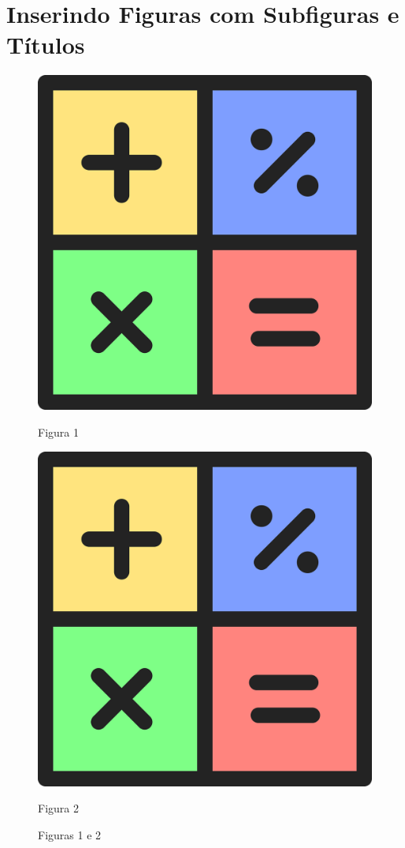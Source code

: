 \documentclass[12pt,a4paper]{article}
\begin{document}
\section{Inserindo Figuras com Subfiguras e Títulos}

\begin{figure}[H]
  \centering
  \begin{minipage}{0.45\textwidth}
    \centering
    \includegraphics[width=\textwidth]{figura}
    \caption{Figura 1}
    \label{fig:figura11}
  \end{minipage}
  \begin{minipage}{0.45\textwidth}
    \centering
    \includegraphics[width=\textwidth]{figura}
    \caption{Figura 2}
    \label{fig:figura12}
  \end{minipage}
  \caption{Figuras 1 e 2}
  \label{fig:figuras}
\end{figure}
\end{document}
